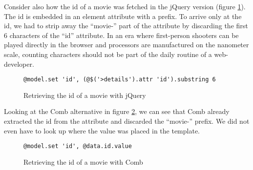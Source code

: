 \documentclass[thesis.tex]{subfiles}
\begin{document}
Consider also how the id of a movie was fetched in the jQuery version
(figure \ref{fig:jquery-fetch-substring}). The id is embedded in an element
attribute with a prefix. To arrive only at the id, we had to strip away the
``movie-'' part of the attribute by discarding the first 6 characters of the
``id'' attribute.
In an era where first-person shooters can be played directly in the browser
and processors are manufactured on the nanometer scale, counting characters
should not be part of the daily routine of a web-developer.
\begin{figure}
	\centering
	\begin{lstlisting}
@model.set 'id', (@$('>details').attr 'id').substring 6
	\end{lstlisting}
	\caption{Retrieving the id of a movie with jQuery}
	\label{fig:jquery-fetch-substring}
\end{figure}
Looking at the Comb alternative in figure \ref{fig:comb-fetch-substring}, we can
see that Comb already extracted the id from the attribute and discarded the
``movie-'' prefix.
We did not even have to look up where the value was placed in the template.
\begin{figure}
	\centering
	\begin{lstlisting}
@model.set 'id', @data.id.value
	\end{lstlisting}
	\caption{Retrieving the id of a movie with Comb}
	\label{fig:comb-fetch-substring}
\end{figure}
\end{document}
